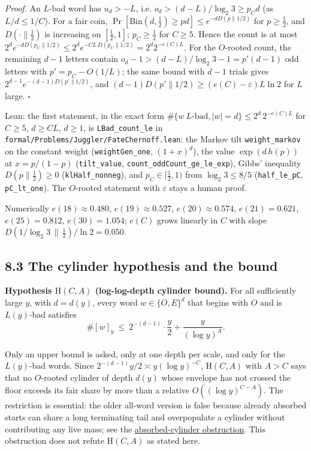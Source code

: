 \documentclass[11pt,a4paper]{article}
\begin{document}
\emph{Proof.} An \(L\)-bad word has \(u_d>-L\), i.e.
\(o_d>(d-L)/\log_2 3\ge p_Cd\) (as \(L/d\le 1/C\)). For a fair coin,
\(\Pr[\mathrm{Bin}(d,\tfrac12)\ge pd]\le e^{-dD(p\|1/2)}\) for
\(p\ge\tfrac12\), and \(D(\cdot\|\tfrac12)\) is increasing on
\([\tfrac12,1]\); \(p_C\ge\tfrac12\) for \(C\ge 5\). Hence the count is
at most
\(2^de^{-dD(p_C\|1/2)}\le 2^de^{-CL\,D(p_C\|1/2)}=2^d2^{-e(C)L}\). For
the \(O\)-rooted count, the remaining \(d-1\) letters contain
\(o_d-1>(d-L)/\log_2 3-1=p'(d-1)\) odd letters with \(p'=p_C-O(1/L)\);
the same bound with \(d-1\) trials gives
\(2^{d-1}e^{-(d-1)D(p'\|1/2)}\), and
\((d-1)D(p'\|1/2)\ge(e(C)-\varepsilon)L\ln 2\) for \(L\) large.
\(\square\)

Lean: the first statement, in the exact form
\(\#\{w\ L\text{-bad},|w|=d\}\le 2^d\,2^{-e(C)L}\) for \(C\ge 5\),
\(d\ge CL\), \(d\ge 1\), is \texttt{\nolinkurl{LBad_count_le}} in
\texttt{\nolinkurl{formal/Problems/Juggler/FateChernoff.lean}}: the
Markov tilt \texttt{\nolinkurl{weight_markov}} on the constant weight
(\texttt{\nolinkurl{weightGen_one}}, \((1+x)^d\)), the value
\(\exp(d\,h(p))\) at \(x=p/(1-p)\) (\texttt{\nolinkurl{tilt_value}},
\texttt{\nolinkurl{count_oddCount_ge_le_exp}}), Gibbs' inequality
\(D(p\|\tfrac12)\ge 0\) (\texttt{\nolinkurl{klHalf_nonneg}}), and
\(p_C\in[\tfrac12,1)\) from \(\log_2 3\le 8/5\)
(\texttt{\nolinkurl{half_le_pC}}, \texttt{\nolinkurl{pC_lt_one}}). The
\(O\)-rooted statement with \(\varepsilon\) stays a human proof.

Numerically \(e(18)\approx0.480\), \(e(19)\approx0.527\),
\(e(20)\approx0.574\), \(e(21)=0.621\), \(e(25)=0.812\),
\(e(30)=1.054\); \(e(C)\) grows linearly in \(C\) with slope
\(D(1/\log_2 3\,\|\,\tfrac12)/\ln 2=0.050\).

\subsection{8.3 The cylinder hypothesis and the
bound}\label{the-cylinder-hypothesis-and-the-bound}

\textbf{Hypothesis \(\mathrm H(C,A)\) (log-log-depth cylinder bound).}
For all sufficiently large \(y\), with \(d=d(y)\), every word
\(w\in\{O,E\}^d\) that begins with \(O\) and is \(L(y)\)-bad satisfies
\[
\#[w]_y\ \le\ 2^{-(d-1)}\cdot\frac y2+\frac{y}{(\log y)^{A}} .
\]

Only an upper bound is asked, only at one depth per scale, and only for
the \(L(y)\)-bad words. Since \(2^{-(d-1)}y/2\asymp y(\log y)^{-C}\),
\(\mathrm H(C,A)\) with \(A>C\) says that no \(O\)-rooted cylinder of
depth \(d(y)\) whose envelope has not crossed the floor exceeds its fair
share by more than a relative \(O((\log y)^{C-A})\). The restriction is
essential: the older all-word version is false because already absorbed
starts can share a long terminating tail and overpopulate a cylinder
without contributing any live mass; see the
\href{https://github.com/sneakyweasel/btlab/blob/main/docs/problems/juggler_absorbed_cylinder.md}{absorbed-cylinder
obstruction}. This obstruction does not refute \(\mathrm H(C,A)\) as
stated here.
\end{document}
